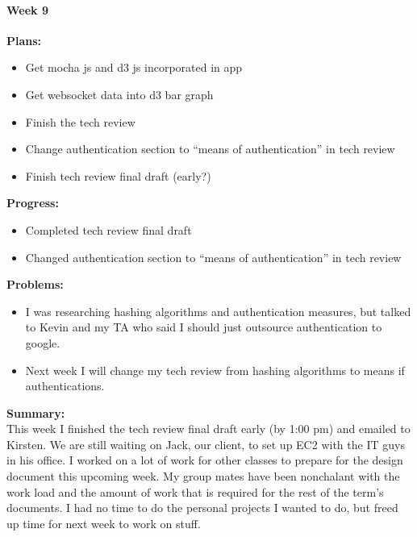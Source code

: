\paragraph{Week 9}
\begin{adjustwidth}{2.5em}{0pt}
    \vspace{-0.5cm}\textbf{Plans:}
    \vspace{-0.5cm}
    \begin{itemize}
        \item Get mocha js and d3 js incorporated in app
        \item Get websocket data into d3 bar graph
        \item Finish the tech review  
        \item Change authentication section to ``means of authentication'' in tech review
        \item Finish tech review final draft (early?)
    \end{itemize} 
    \vspace{-0.3cm}\textbf{Progress:}
    \vspace{-0.5cm}
    \begin{itemize}
        \item Completed tech review final draft
        \item Changed authentication section to ``means of authentication'' in tech review
    \end{itemize} 
    \vspace{-0.3cm}\textbf{Problems:}
    \vspace{-0.5cm}
    \begin{itemize}
        \item I was researching hashing algorithms and authentication measures, but talked to Kevin and my TA who said I should just outsource authentication to google.
        \item Next week I will change my tech review from hashing algorithms to means if authentications.
    \end{itemize}  
    \vspace{-0.3cm}\noindent\textbf{Summary:}\\
    \noindent This week I finished the tech review final draft early (by 1:00 pm) and emailed to Kirsten. We are still waiting on Jack, our client, to set up EC2 with the IT guys in his office. I worked on a lot of work for other classes to prepare for the design document this upcoming week. My group mates have been nonchalant with the work load and the amount of work that is required for the rest of the term's documents. I had no time to do the personal projects I wanted to do, but freed up time for next week to work on stuff.
\end{adjustwidth} 
